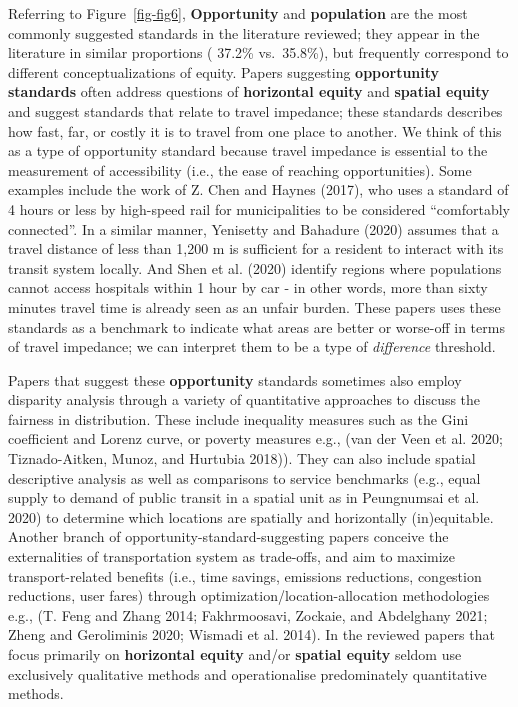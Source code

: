 \documentclass[12pt, oneside]{report}
\begin{document}
Referring to Figure~\ref{fig-fig6}, \textbf{Opportunity} and
\textbf{population} are the most commonly suggested standards in the
literature reviewed; they appear in the literature in similar
proportions ( 37.2\% vs.~35.8\%), but frequently correspond to different
conceptualizations of equity. Papers suggesting \textbf{opportunity
standards} often address questions of \textbf{horizontal equity} and
\textbf{spatial equity} and suggest standards that relate to travel
impedance; these standards describes how fast, far, or costly it is to
travel from one place to another. We think of this as a type of
opportunity standard because travel impedance is essential to the
measurement of accessibility (i.e., the ease of reaching opportunities).
Some examples include the work of Z. Chen and Haynes (2017), who uses a
standard of 4 hours or less by high-speed rail for municipalities to be
considered ``comfortably connected''. In a similar manner, Yenisetty and
Bahadure (2020) assumes that a travel distance of less than 1,200 m is
sufficient for a resident to interact with its transit system locally.
And Shen et al. (2020) identify regions where populations cannot access
hospitals within 1 hour by car - in other words, more than sixty minutes
travel time is already seen as an unfair burden. These papers uses these
standards as a benchmark to indicate what areas are better or worse-off
in terms of travel impedance; we can interpret them to be a type of
\emph{difference} threshold.

Papers that suggest these \textbf{opportunity} standards sometimes also
employ disparity analysis through a variety of quantitative approaches
to discuss the fairness in distribution. These include inequality
measures such as the Gini coefficient and Lorenz curve, or poverty
measures e.g., (van der Veen et al. 2020; Tiznado-Aitken, Munoz, and
Hurtubia 2018)). They can also include spatial descriptive analysis as
well as comparisons to service benchmarks (e.g., equal supply to demand
of public transit in a spatial unit as in Peungnumsai et al. 2020) to
determine which locations are spatially and horizontally (in)equitable.
Another branch of opportunity-standard-suggesting papers conceive the
externalities of transportation system as trade-offs, and aim to
maximize transport-related benefits (i.e., time savings, emissions
reductions, congestion reductions, user fares) through
optimization/location-allocation methodologies e.g., (T. Feng and Zhang
2014; Fakhrmoosavi, Zockaie, and Abdelghany 2021; Zheng and Geroliminis
2020; Wismadi et al. 2014). In the reviewed papers that focus primarily
on \textbf{horizontal equity} and/or \textbf{spatial equity} seldom use
exclusively qualitative methods and operationalise predominately
quantitative methods.
\end{document}
